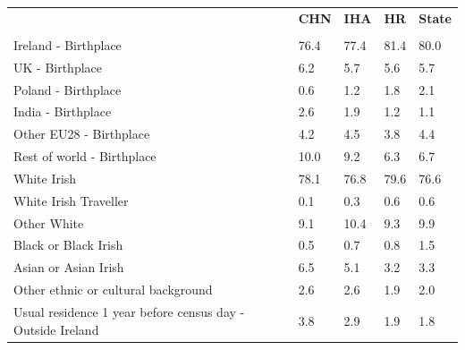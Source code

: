 \documentclass{article}
\begin{document}
\pagebreak
\begin{table}[h]	
\centering
		\begin{tabular}{KTTTT}
  \hline
& \textbf{CHN} & \textbf{IHA} & \textbf{HR}& \textbf{State}\\ 
  \hline
    \\ 
    \hline
Ireland - Birthplace & 76.4& 77.4& 81.4& 80.0\\
UK - Birthplace & 6.2& 5.7& 5.6& 5.7\\
Poland - Birthplace & 0.6& 1.2& 1.8& 2.1\\
India - Birthplace & 2.6& 1.9& 1.2& 1.1\\
Other EU28 - Birthplace & 4.2& 4.5& 3.8& 4.4\\
Rest of world - Birthplace & 10.0&  9.2&  6.3&  6.7\\
    \hline
White Irish & 78.1& 76.8& 79.6& 76.6\\
White Irish Traveller & 0.1& 0.3& 0.6& 0.6\\
Other White &  9.1& 10.4&  9.3&  9.9\\
Black or Black Irish & 0.5& 0.7& 0.8& 1.5\\
Asian or Asian Irish & 6.5& 5.1& 3.2& 3.3\\
Other ethnic or cultural background & 2.6& 2.6& 1.9& 2.0\\
    \hline
Usual residence 1 year before census day - Outside Ireland & 3.8& 2.9& 1.9& 1.8\\


\end{tabular}
\end{table}
\end{document}
